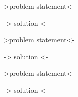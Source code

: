 \documentclass[12pt]{article}
\newenvironment{problem}[2][Problem]
{
	\begin{trivlist} 
		\item[\hskip \labelsep {\bfseries #1 #2:}]
	}
{
	\end{trivlist}
	}
\newenvironment{solution}[1][Solution]
{
	\begin{trivlist} 
		\item[\hskip \labelsep {\itshape #1:}]
	}
	{
	\end{trivlist}
}
\begin{document}
\newpage
\begin{problem}{4}
->problem statement<-
\noindent
\newline
\newline
\begin{solution}
-> solution <-
\end{solution}
\end{problem}






\newpage
\begin{problem}{5}
->problem statement<-
\noindent
\newline
\newline
\begin{solution}
-> solution <-
\end{solution}
\end{problem}






\newpage
\begin{problem}{6}
->problem statement<-
\noindent
\newline
\newline
\begin{solution}
-> solution <-
\end{solution}
\end{problem}
\end{document}
